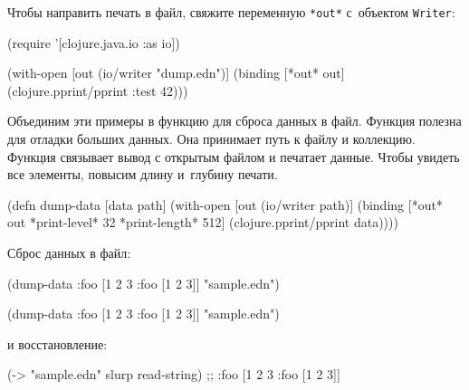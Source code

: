 \fi


Чтобы направить печать в файл, свяжите переменную \verb|*out*| с~объектом
\verb|Writer|:

\begin{english}
  \begin{clojure}
(require '[clojure.java.io :as io])

(with-open [out (io/writer "dump.edn")]
  (binding [*out* out]
    (clojure.pprint/pprint {:test 42})))
  \end{clojure}
\end{english}

Объединим эти примеры в функцию для сброса данных в файл. Функция полезна для
отладки больших данных. Она принимает путь к файлу и коллекцию. Функция
связывает вывод с открытым файлом и печатает данные. Чтобы увидеть все элементы,
повысим длину и~глубину печати.

\pagebreaklarge

\begin{english}
  \begin{clojure}
(defn dump-data
  [data path]
  (with-open [out (io/writer path)]
    (binding [*out* out
              *print-level* 32
              *print-length* 512]
      (clojure.pprint/pprint data))))
  \end{clojure}
\end{english}

\noindent
Сброс данных в файл:

\ifnarrow

\begin{english}
  \begin{clojure}
(dump-data
  {:foo [1 2 3 {:foo [1 2 3]}]}
  "sample.edn")
  \end{clojure}
\end{english}

\else

\begin{english}
  \begin{clojure}
(dump-data {:foo [1 2 3 {:foo [1 2 3]}]} "sample.edn")
  \end{clojure}
\end{english}

\fi

\noindent
и восстановление:

\begin{english}
  \begin{clojure}
(-> "sample.edn" slurp read-string)
;; {:foo [1 2 3 {:foo [1 2 3]}]}
  \end{clojure}
\end{english}

